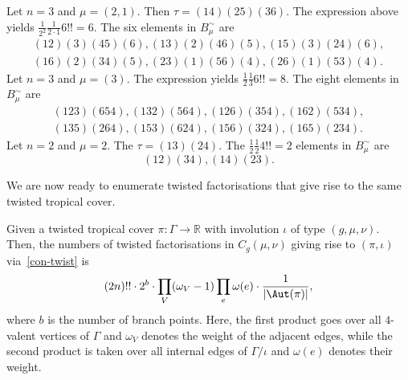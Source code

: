 \begin{exam}
Let $n=3$ and $\mu=(2,1)$. Then $\tau=(14)(25)(36)$.
The expression above yields $\frac{1}{2^2}\frac{1}{2\cdot 1}6!! = 6$.
The six elements in $B^{\sim}_\mu$ are
\begin{gather*}
    (12)(3)(45)(6), (13)(2)(46)(5), (15)(3)(24)(6), \\
    (16)(2)(34)(5), (23)(1)(56)(4), (26)(1)(53)(4).
\end{gather*}
\noindent
Let $n=3$ and $\mu=(3)$. The expression yields $\frac{1}{2}\frac{1}{3}6!!= 8$.
The eight elements in $B^{\sim}_\mu$ are
\begin{gather*}
    (123)(654), (132)(564), (126)(354), (162)(534), \\ 
    (135)(264), (153)(624), (156)(324), (165)(234).
\end{gather*}
\noindent
Let $n=2$ and $\mu=2$. The $\tau=(13)(24)$. The $\frac{1}{2}\frac{1}{2}4!!=2$ elements in $B^{\sim}_\mu$ are
$$ (12)(34), (14)(23).$$
\end{exam}

We are now ready to enumerate twisted factorisations that give rise to the same twisted tropical cover.

\begin{prop}\label{thm-covermult}
Given a twisted tropical cover $\pi\colon\Gamma\to\mathbb{R}$ with involution $\iota$ of type $(g,\mu,\nu)$. Then, the numbers of twisted factorisations in $C_g(\mu,\nu)$ giving rise to $(\pi,\iota)$ via~\cref{con-twist} is
\begin{equation*}
(2n)!!\cdot 2^{b}\cdot \prod_V (\omega_V-1)\prod_e\omega(e)\cdot \frac{1}{|\Aut(\pi)|},
\end{equation*}
where $b$ is the number of branch points. Here, the first product goes over all $4$-valent vertices of $\Gamma$ and $\omega_V$ denotes the weight of the adjacent edges, while the second product is taken over all internal edges of $\Gamma/\iota$ and $\omega(e)$ denotes their weight.
\end{prop}

